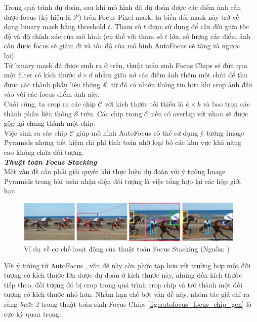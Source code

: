 {    \noindent
    Trong quá trình dự đoán, sau khi mô hình đã dự đoán được các điểm ảnh cần được focus (ký hiệu là $\mathcal{P}$) trên Focus Pixel  mask, ta biến đổi mask này trở về dạng binary mask bằng threshold $t$.
    Tham số $t$ được sử dụng để cân đối giữa tốc độ và độ chính xác của mô hình (cụ thể với tham số $t$ lớn, số lượng các điểm ảnh cần được focus sẽ giảm đi và tốc độ của mô hình AutoFocus sẽ tăng và ngược lại). \\
    Từ binary mask đã được sinh ra ở trên, thuật toán sinh Focus Chips sẽ đưa qua một filter có kích thước $d \times d$ nhằm giãn nở các điểm ảnh thêm một chút để thu được các thành phần liên thông $\mathcal{S}$, từ đó có nhiều thông tin hơn khi crop ảnh đầu vào với các focus điểm ảnh này. \\
    Cuối cùng, ta crop ra các chip $\mathcal{C}$ với kích thước tối thiểu là $k \times k$ và bao trọn các thành phần liên thông $\mathcal{S}$ trên.
    Các chip trong $\mathcal{C}$ nếu có overlap với nhau sẽ được gộp lại chung thành một chip. \\
    Việc sinh ra các chip $\mathcal{C}$ giúp mô hình AutoFocus có thể sử dụng ý tưởng Image Pyramids nhưng tiết kiệm chi phí tính toán nhờ loại bỏ các khu vực khả năng cao không chứa đối tượng. \\

    \noindent
    \textbf{\textit{Thuật toán Focus Stacking}} \\
    Một vấn đề cần phải giải quyết khi thực hiện dự đoán với ý tưởng Image Pyramids trong bài toán nhận diện đối tượng là việc tổng hợp lại các hộp giới hạn.

    \begin{figure}[H]
        \centering
        \includegraphics[width=15cm] {images/autofocus_focus_stack}
        \caption{Ví dụ về cơ chế hoạt động của thuật toán Focus Stacking (Nguồn: \cite{najibi2019autofocus})}
        \label{fig:autofocus_focus_stack}
    \end{figure}

    \noindent
    Với ý tưởng từ AutoFocus \cite{najibi2019autofocus}, vấn đề này còn phức tạp hơn với trường hợp một đối tượng có kích thước lớn được dự đoán ở kích thước này, nhưng đến kích thước tiếp theo, đối tượng đó bị crop trong quá trình crop chip và trở thành một đối tượng có kích thước nhỏ hơn.
    Nhằm hạn chế bớt vấn đề này, nhóm tác giả chỉ ra rằng \textit{bước 2} trong thuật toán sinh Focus Chips \ref{fig:autofocus_focus_chip_gen} là cực kỳ quan trọng.

}
